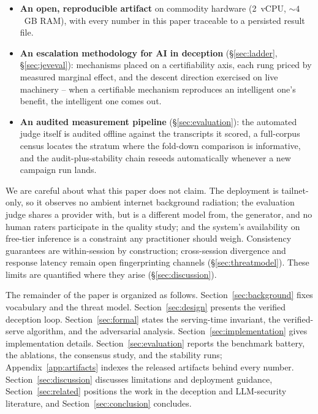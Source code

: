 \begin{itemize}
of serves to verified generation with zero fallback serves.
\item \textbf{An open, reproducible artifact} on commodity hardware
(2~vCPU, ${\sim}4$~GB RAM), with every number in this paper traceable to a
persisted result file.
\item \textbf{An escalation methodology for AI in deception}
(\S\ref{sec:ladder}, \S\ref{sec:jeveval}): mechanisms placed on a
certifiability axis, each rung priced by measured marginal effect, and
the descent direction exercised on live machinery -- when a certifiable
mechanism reproduces an intelligent one's benefit, the intelligent one
comes out.
\item \textbf{An audited measurement pipeline} (\S\ref{sec:evaluation}):
the automated judge itself is audited offline against the transcripts it
scored, a full-corpus census locates the stratum where the fold-down
comparison is informative, and the audit-plus-stability chain reseeds
automatically whenever a new campaign run lands.
\end{itemize}

We are careful about what this paper does not claim. The deployment is
tailnet-only, so it observes no ambient internet background radiation;
the evaluation judge shares a provider with, but is a different model from, the
generator, and no human raters participate in the quality study; and the
system's availability on free-tier inference is a
constraint any practitioner should weigh. Consistency guarantees are
within-session by construction; cross-session divergence and response
latency remain open fingerprinting channels (\S\ref{sec:threatmodel}).
These limits are quantified
where they arise (\S\ref{sec:discussion}).

The remainder of the paper is organized as follows.
Section~\ref{sec:background} fixes vocabulary and the threat model.
Section~\ref{sec:design} presents the verified deception loop.
Section~\ref{sec:formal} states the serving-time invariant, the verified-serve
algorithm, and the adversarial analysis.
Section~\ref{sec:implementation} gives implementation details.
Section~\ref{sec:evaluation} reports the benchmark battery, the ablations,
the consensus study, and the stability runs; Appendix~\ref{app:artifacts}
indexes the released artifacts behind every number.
Section~\ref{sec:discussion} discusses limitations and deployment
guidance, Section~\ref{sec:related} positions the work in the deception
and LLM-security literature, and Section~\ref{sec:conclusion} concludes.
